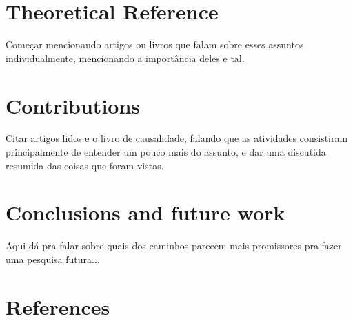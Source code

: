 \documentclass{article}
\begin{document}


\section{Theoretical Reference}\label{sec:theoRef}

{\color{red} Começar mencionando artigos ou livros que falam sobre esses assuntos individualmente, mencionando a importância deles e tal.}



\section{Contributions}\label{sec:contribs}

{\color{red} Citar artigos lidos e o livro de causalidade, falando que as atividades consistiram principalmente de entender um pouco mais do assunto, e dar uma discutida resumida das coisas que foram vistas.}

\section{Conclusions and future work}

{\color{red} Aqui dá pra falar sobre quais dos caminhos parecem mais promissores pra fazer uma pesquisa futura...}

\section{References}




\end{document}
